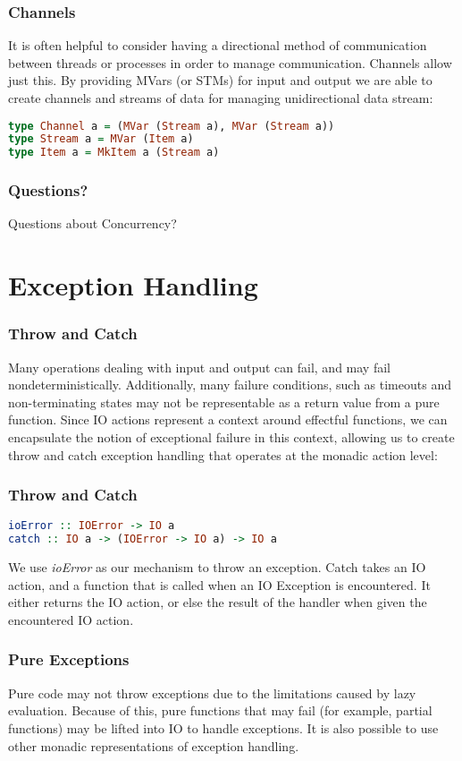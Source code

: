 \documentclass{beamer}
\begin{document}
\begin{frame}[fragile]
  \frametitle{Channels}
  It is often helpful to consider having a directional method of
  communication between threads or processes in order to manage
  communication.  Channels allow just this.  By providing MVars (or
  STMs) for input and output we are able to create channels and
  streams of data for managing unidirectional data stream:
\begin{lstlisting}[language=haskell]
type Channel a = (MVar (Stream a), MVar (Stream a))
type Stream a = MVar (Item a)
type Item a = MkItem a (Stream a)
\end{lstlisting}
\end{frame}
\begin{frame}
  \frametitle{Questions?}
  Questions about Concurrency?
\end{frame}

\section{Exception Handling}
\begin{frame}
  \frametitle{Throw and Catch}
  Many operations dealing with input and output can fail, and may fail
  nondeterministically.  Additionally, many failure conditions, such
  as timeouts and non-terminating states may not be representable as a
  return value from a pure function.  Since IO actions represent a
  context around effectful functions, we can encapsulate the notion of
  exceptional failure in this context, allowing us to create throw and
  catch exception handling that operates at the monadic action level:
\end{frame}

\begin{frame}[fragile]
  \frametitle{Throw and Catch}
\begin{lstlisting}[language=haskell]
ioError :: IOError -> IO a
catch :: IO a -> (IOError -> IO a) -> IO a
\end{lstlisting}
  We use \emph{ioError} as our mechanism to throw an exception.  Catch
  takes an IO action, and a function that is called when an IO
  Exception is encountered.  It either returns the IO action, or else
  the result of the handler when given the encountered IO action.
\end{frame}

\begin{frame}
  \frametitle{Pure Exceptions}
  Pure code may not throw exceptions due to the limitations caused by
  lazy evaluation.  Because of this, pure functions that may fail (for
  example, partial functions) may be lifted into IO to handle
  exceptions.  It is also possible to use other monadic
  representations of exception handling.
\end{frame}
\end{document}
